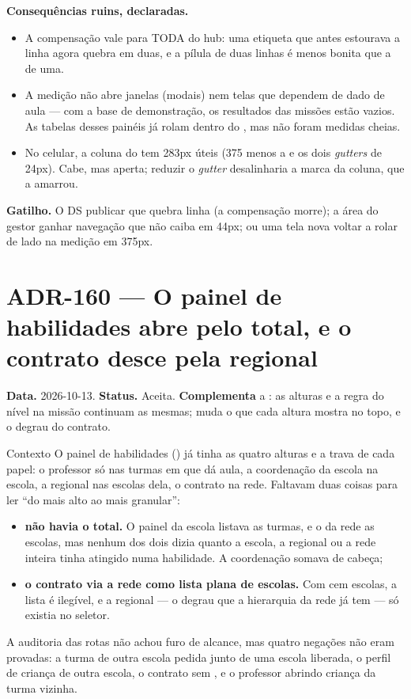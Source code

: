 \textbf{Consequências ruins, declaradas.}
\begin{itemize}
  \item A compensação vale para TODA  do hub: uma etiqueta que antes
    estourava a linha agora quebra em duas, e a pílula de duas linhas é menos
    bonita que a de uma.
  \item A medição não abre janelas (modais) nem telas que dependem de dado de
    aula --- com a base de demonstração, os resultados das missões estão
    vazios. As tabelas desses painéis já rolam dentro do , mas
    não foram medidas cheias.
  \item No celular, a coluna do  tem 283px úteis (375 menos a
     e os dois \emph{gutters} de 24px). Cabe, mas aperta; reduzir o
    \emph{gutter} desalinharia a marca da coluna, que a  amarrou.
\end{itemize}

\textbf{Gatilho.} O DS publicar  que quebra linha (a compensação morre);
a área do gestor ganhar navegação que não caiba em 44px; ou uma tela nova
voltar a rolar de lado na medição em 375px.


\section{ADR-160 --- O painel de habilidades abre pelo total, e o contrato desce pela regional}
\label{adr:painel-de-habilidades-total}

\textbf{Data.} 2026-10-13. \textbf{Status.} Aceita. \textbf{Complementa} a
: as alturas e a regra do nível na missão continuam as mesmas;
muda o que cada altura mostra no topo, e o degrau do contrato.

\begin{especificacao}{Contexto}
O painel de habilidades () já tinha as quatro alturas e a trava
de cada papel: o professor só nas turmas em que dá aula, a coordenação da
escola na escola, a regional nas escolas dela, o contrato na rede. Faltavam
duas coisas para ler \enquote{do mais alto ao mais granular}:
\begin{itemize}
  \item \textbf{não havia o total.} O painel da escola listava as turmas, e o da
    rede as escolas, mas nenhum dos dois dizia quanto a escola, a regional ou a
    rede inteira tinha atingido numa habilidade. A coordenação somava de cabeça;
  \item \textbf{o contrato via a rede como lista plana de escolas.} Com cem
    escolas, a lista é ilegível, e a regional --- o degrau que a hierarquia da
    rede já tem --- só existia no seletor.
\end{itemize}
A auditoria das rotas não achou furo de alcance, mas quatro negações não eram
provadas: a turma de outra escola pedida junto de uma escola liberada, o perfil
de criança de outra escola, o contrato sem , e o professor
abrindo criança da turma vizinha.
\end{especificacao}

